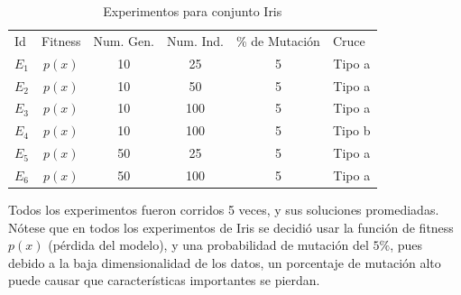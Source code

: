 \documentclass[conference]{IEEEtran}
\begin{document}
\begin{table}[h]
\centering
\caption{Experimentos para conjunto Iris}
\label{tablaI}
\begin{tabular}{cccccc}
\multicolumn{1}{l}{Id} &\multicolumn{1}{l}{Fitness} & \multicolumn{1}{l}{Num. Gen.} & \multicolumn{1}{l}{Num. Ind.} & \multicolumn{1}{l}{\% de Mutación} & \multicolumn{1}{l}{Cruce} \\
$E_1$&$p(x)$                        & 10                            & 25                            & 5                                  & Tipo a                    \\
$E_2$&$p(x)$                        & 10                            & 50                            & 5                                  & Tipo a                    \\
$E_3$&$p(x)$                        & 10                            & 100                           & 5                                  & Tipo a                    \\
$E_4$&$p(x) $                       & 10                            & 100                           & 5                                  & Tipo b                    \\
$E_5$&$p(x)$                        & 50                            & 25                            & 5                                  & Tipo a                    \\
$E_6$&$p(x)$                        & 50                            & 100                           & 5                                  & Tipo a                   
\end{tabular}
\end{table}

Todos los experimentos fueron corridos 5 veces, y sus soluciones promediadas.
Nótese que en todos los experimentos de Iris se decidió usar la función de fitness $p(x)$ (pérdida del modelo), y una probabilidad de mutación del $5\%$, pues debido a la baja dimensionalidad de los datos, un porcentaje de mutación alto puede causar que características importantes se pierdan.
\end{document}
